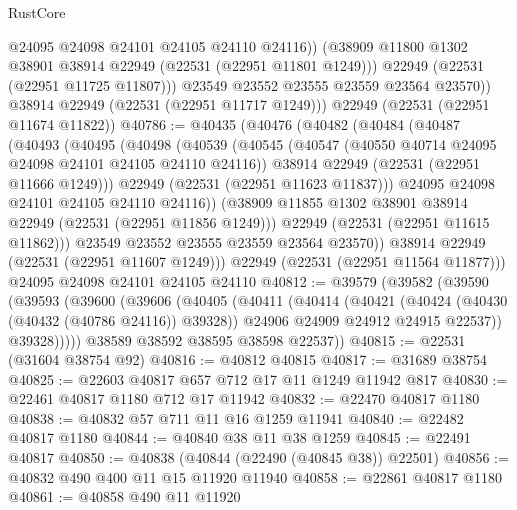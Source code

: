 \begin{lexlean}{RustCore}
\begin{coremodule}
                @24095
                @24098
                @24101
                @24105
                @24110
                @24116))
            (@38909 @11800 @1302 @38901 @38914 @22949 (@22531 (@22951 @11801 @1249)))
            @22949
            (@22531 (@22951 @11725 @11807)))
          @23549
          @23552
          @23555
          @23559
          @23564
          @23570))
      @38914
      @22949
      (@22531 (@22951 @11717 @1249)))
    @22949
    (@22531 (@22951 @11674 @11822))
@40786 := @40435
    (@40476
      (@40482
        (@40484
          (@40487
            (@40493
              (@40495
                (@40498
                  (@40539
                    (@40545
                      (@40547 (@40550 @40714 @24095 @24098 @24101 @24105 @24110 @24116))
                      @38914
                      @22949
                      (@22531 (@22951 @11666 @1249)))
                    @22949
                    (@22531 (@22951 @11623 @11837)))
                  @24095
                  @24098
                  @24101
                  @24105
                  @24110
                  @24116))
              (@38909 @11855 @1302 @38901 @38914 @22949 (@22531 (@22951 @11856 @1249)))
              @22949
              (@22531 (@22951 @11615 @11862)))
            @23549
            @23552
            @23555
            @23559
            @23564
            @23570))
        @38914
        @22949
        (@22531 (@22951 @11607 @1249)))
      @22949
      (@22531 (@22951 @11564 @11877)))
    @24095
    @24098
    @24101
    @24105
    @24110
@40812 := @39579
    (@39582
      (@39590
        (@39593
          (@39600
            (@39606
              (@40405
                (@40411
                  (@40414
                    (@40421
                      (@40424 (@40430 (@40432 (@40786 @24116)) @39328))
                      @24906
                      @24909
                      @24912
                      @24915
                      @22537))
                  @39328)))))
        @38589
        @38592
        @38595
        @38598
        @22537))
@40815 := @22531 (@31604 @38754 @92)
@40816 := @40812 @40815
@40817 := @31689 @38754
@40825 := @22603 @40817 @657 @712 @17 @11 @1249 @11942 @817
@40830 := @22461 @40817 @1180 @712 @17 @11942
@40832 := @22470 @40817 @1180
@40838 := @40832 @57 @711 @11 @16 @1259 @11941
@40840 := @22482 @40817 @1180
@40844 := @40840 @38 @11 @38 @1259
@40845 := @22491 @40817
@40850 := @40838 (@40844 (@22490 (@40845 @38)) @22501)
@40856 := @40832 @490 @400 @11 @15 @11920 @11940
@40858 := @22861 @40817 @1180
@40861 := @40858 @490 @11 @11920

\end{coremodule}
\end{lexlean}
